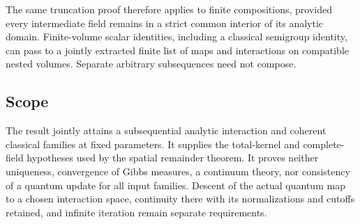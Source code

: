 The same truncation proof therefore applies to finite
compositions, provided every intermediate field remains in
a strict common interior of its analytic domain. Finite-volume
scalar identities, including a classical semigroup identity,
can pass to a jointly extracted finite list of maps and
interactions on compatible nested volumes. Separate arbitrary
subsequences need not compose.

\subsection{Scope}
\label{aic-scope}

The result jointly attains a subsequential analytic interaction
and coherent classical families at fixed parameters. It supplies
the total-kernel and complete-field hypotheses used by the
spatial remainder theorem. It proves neither uniqueness,
convergence of Gibbs measures, a continuum theory, nor consistency
of a quantum update for all input families. Descent of the actual
quantum map to a chosen interaction space, continuity there with
its normalizations and cutoffs retained, and infinite iteration
remain separate requirements.
